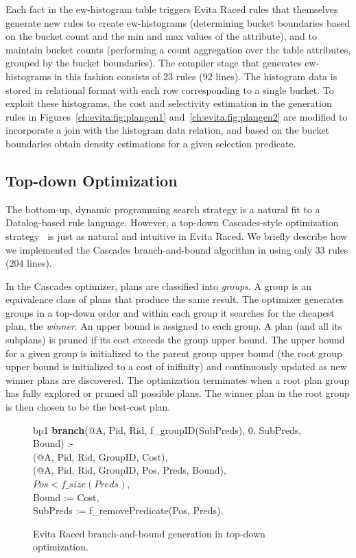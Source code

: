 Each fact in the ew-histogram table triggers Evita Raced rules that themselves generate
new rules to create ew-histograms (determining bucket boundaries based on the bucket
count and the min and max values of the attribute), and to maintain bucket counts (performing
a count aggregation over the table attributes, grouped by the bucket boundaries). The compiler
stage that generates ew-histograms in this fashion consists of $23$ rules ($92$ lines). The 
histogram data is stored in relational format with each row corresponding to a single bucket.
To exploit these histograms, the cost and selectivity estimation in the  generation rules
in Figures~\ref{ch:evita:fig:plangen1} and~\ref{ch:evita:fig:plangen2} are modified to incorporate
a join with the histogram data relation, and based on the bucket boundaries obtain density 
estimations for a given selection predicate.

\subsection{Top-down Optimization}
\label{ch:evita:sec:cascades}

The bottom-up, dynamic programming search strategy is a natural fit to a Datalog-based rule 
language. However, a top-down Cascades-style optimization strategy~\cite{cascades} is just
as natural and intuitive in Evita Raced. We briefly describe how we implemented the Cascades 
branch-and-bound algorithm in \OVERLOG using only $33$ rules ($204$ lines).

In the Cascades optimizer, plans are classified into {\em groups}. A group is an equivalence class
of plans that produce the same result. The optimizer generates groups in a top-down order and
within each group it searches for the cheapest plan, the {\em winner}. An upper bound is assigned
to each group. A plan (and all its subplans) is pruned if its cost exceeds the group upper bound.
The upper bound for a given group is initialized to the parent group upper bound (the root group 
upper bound is initialized to a cost of inifinity) and continuously updated as new winner plans
are discovered. The optimization terminates when a root plan group has fully explored or pruned
all possible plans. The winner plan in the root group is then chosen to be the best-cost plan.


\begin{figure}
\ssp
\centering
\begin{boxedminipage}{\linewidth}
bp1 {\bf branch}(@A, Pid, Rid, f\_groupID(SubPreds), 0, SubPreds, Bound) :- \\
(@A, Pid, Rid, GroupID, Cost), \\
(@A, Pid, Rid, GroupID, Pos, Preds, Bound), \\
\datalogspace $Pos < f\_size(Preds)$, \\
\datalogspace Bound := Cost, \\
\datalogspace SubPreds := f\_removePredicate(Pos, Preds). \\
\end{boxedminipage}
\caption{\label{ch:evita:fig:bb} Evita Raced branch-and-bound generation in top-down optimization.}
\end{figure}

